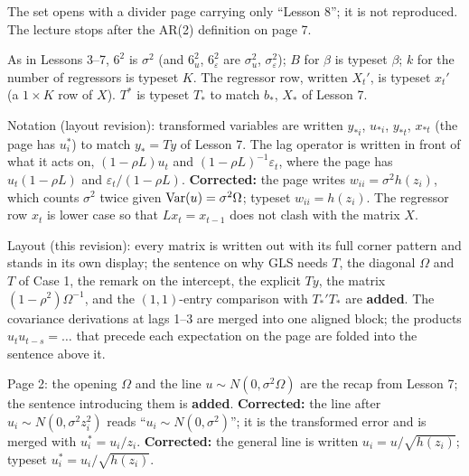\documentclass[11pt]{article}
\begin{document}
\begin{transcriptnotes}
  \item The set opens with a divider page carrying only ``Lesson 8''; it is not
        reproduced. The lecture stops after the AR(2) definition on page 7.
  \item As in Lessons 3--7, $6^{2}$ is $\sigma^{2}$ (and $6_{u}^{2}$,
        $6_{\varepsilon}^{2}$ are $\sigma_{u}^{2}$, $\sigma_{\varepsilon}^{2}$); $B$
        for $\beta$ is typeset $\beta$; $k$ for the number of regressors is typeset
        $K$. The regressor row, written $X_{t}'$, is typeset $x_{t}'$ (a $1\times K$
        row of $X$). $T^{*}$ is typeset $T_{*}$ to match $b_{*}$, $X_{*}$ of
        Lesson 7.
  \item Notation (layout revision): transformed variables are written
        $y_{*i}$, $u_{*i}$, $y_{*t}$, $x_{*t}$ (the page has $u_{i}^{*}$) to match
        $y_{*} = Ty$ of Lesson 7. The lag operator is written in front of what it
        acts on, $(1-\rho L)u_{t}$ and $(1-\rho L)^{-1}\varepsilon_{t}$, where the page
        has $u_{t}(1-\rho L)$ and $\varepsilon_{t}/(1-\rho L)$. \textbf{Corrected:}
        the page writes $w_{ii} = \sigma^{2}h(z_{i})$, which counts $\sigma^{2}$ twice
        given $\operatorname{Var}(u) = \sigma^{2}\Omega$; typeset $w_{ii} = h(z_{i})$. The regressor
        row $x_{t}$ is lower case so that $Lx_{t} = x_{t-1}$ does not clash with the
        matrix $X$.
  \item Layout (this revision): every matrix is written out with its full corner
        pattern and stands in its own display; the sentence on why GLS needs $T$,
        the diagonal $\Omega$ and $T$ of Case 1, the remark on the intercept, the
        explicit $Ty$, the matrix $(1-\rho^{2})\Omega^{-1}$, and the $(1,1)$-entry
        comparison with $T_{*}'T_{*}$ are \textbf{added}. The covariance derivations
        at lags 1--3 are merged into one aligned block; the products
        $u_{t}u_{t-s} = \ldots$ that precede each expectation on the page are folded
        into the sentence above it.
  \item Page 2: the opening $\Omega$ and the line $u \sim N(0, \sigma^{2}\Omega)$ are
        the recap from Lesson 7; the sentence introducing them is \textbf{added}.
        \textbf{Corrected:} the line after $u_{i} \sim N(0, \sigma^{2}z_{i}^{2})$ reads
        ``$u_{i} \sim N(0, \sigma^{2})$''; it is the transformed error and is merged
        with $u_{i}^{*} = u_{i}/z_{i}$. \textbf{Corrected:} the general line is
        written $u_{i} = u/\sqrt{h(z_{i})}$; typeset $u_{i}^{*} = u_{i}/\sqrt{h(z_{i})}$.

\end{transcriptnotes}
\end{document}

